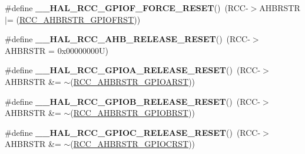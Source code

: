\begin{DoxyCompactItemize}
\item 
\mbox{\label{group___r_c_c___a_h_b___force___release___reset_gaddfca42e493e7c163e9decf0462183df}} 
\#define {\bfseries \+\_\+\+\_\+\+H\+A\+L\+\_\+\+R\+C\+C\+\_\+\+G\+P\+I\+O\+F\+\_\+\+F\+O\+R\+C\+E\+\_\+\+R\+E\+S\+ET}()~(R\+CC-\/$>$A\+H\+B\+R\+S\+TR $\vert$= (\hyperlink{group___peripheral___registers___bits___definition_ga74e619b0f46c362da4e814d044e9bf86}{R\+C\+C\+\_\+\+A\+H\+B\+R\+S\+T\+R\+\_\+\+G\+P\+I\+O\+F\+R\+ST}))
\item 
\mbox{\label{group___r_c_c___a_h_b___force___release___reset_gab9a849fdb7ef7ea4021af51799b474d7}} 
\#define {\bfseries \+\_\+\+\_\+\+H\+A\+L\+\_\+\+R\+C\+C\+\_\+\+A\+H\+B\+\_\+\+R\+E\+L\+E\+A\+S\+E\+\_\+\+R\+E\+S\+ET}()~(R\+CC-\/$>$A\+H\+B\+R\+S\+TR = 0x00000000\+U)
\item 
\mbox{\label{group___r_c_c___a_h_b___force___release___reset_gad56e47c2eacd972491f94296053d0cc3}} 
\#define {\bfseries \+\_\+\+\_\+\+H\+A\+L\+\_\+\+R\+C\+C\+\_\+\+G\+P\+I\+O\+A\+\_\+\+R\+E\+L\+E\+A\+S\+E\+\_\+\+R\+E\+S\+ET}()~(R\+CC-\/$>$A\+H\+B\+R\+S\+TR \&= $\sim$(\hyperlink{group___peripheral___registers___bits___definition_ga327f966b6e8dc82dc0ac950539ce0407}{R\+C\+C\+\_\+\+A\+H\+B\+R\+S\+T\+R\+\_\+\+G\+P\+I\+O\+A\+R\+ST}))
\item 
\mbox{\label{group___r_c_c___a_h_b___force___release___reset_gaf03da3b36478071844fbd77df618a686}} 
\#define {\bfseries \+\_\+\+\_\+\+H\+A\+L\+\_\+\+R\+C\+C\+\_\+\+G\+P\+I\+O\+B\+\_\+\+R\+E\+L\+E\+A\+S\+E\+\_\+\+R\+E\+S\+ET}()~(R\+CC-\/$>$A\+H\+B\+R\+S\+TR \&= $\sim$(\hyperlink{group___peripheral___registers___bits___definition_gab07dc17b79c908bdbf9cf196947d0035}{R\+C\+C\+\_\+\+A\+H\+B\+R\+S\+T\+R\+\_\+\+G\+P\+I\+O\+B\+R\+ST}))
\item 
\mbox{\label{group___r_c_c___a_h_b___force___release___reset_ga1df0e3536d3450435bdccdbe9c878736}} 
\#define {\bfseries \+\_\+\+\_\+\+H\+A\+L\+\_\+\+R\+C\+C\+\_\+\+G\+P\+I\+O\+C\+\_\+\+R\+E\+L\+E\+A\+S\+E\+\_\+\+R\+E\+S\+ET}()~(R\+CC-\/$>$A\+H\+B\+R\+S\+TR \&= $\sim$(\hyperlink{group___peripheral___registers___bits___definition_ga5b837c7b81c1a4b8f986c23b7c5b5afa}{R\+C\+C\+\_\+\+A\+H\+B\+R\+S\+T\+R\+\_\+\+G\+P\+I\+O\+C\+R\+ST}))

\end{DoxyCompactItemize}
